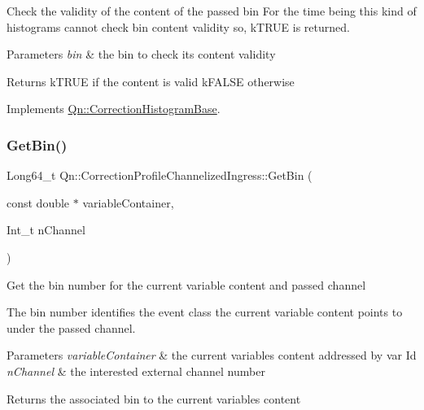Check the validity of the content of the passed bin For the time being this kind of histograms cannot check bin content validity so, k\+T\+R\+UE is returned. 
\begin{DoxyParams}{Parameters}
{\em bin} & the bin to check its content validity \\
\hline
\end{DoxyParams}
\begin{DoxyReturn}{Returns}
k\+T\+R\+UE if the content is valid k\+F\+A\+L\+SE otherwise 
\end{DoxyReturn}


Implements \mbox{\hyperlink{classQn_1_1CorrectionHistogramBase_a4db2c92ceaffefaa91475a721612d80d}{Qn\+::\+Correction\+Histogram\+Base}}.

\mbox{\label{classQn_1_1CorrectionProfileChannelizedIngress_aa9e937955e58199dedc3a75e5d593aa2}} 
\subsubsection{\texorpdfstring{Get\+Bin()}{GetBin()}}
{\footnotesize\ttfamily Long64\+\_\+t Qn\+::\+Correction\+Profile\+Channelized\+Ingress\+::\+Get\+Bin (\begin{DoxyParamCaption}\item[{const double $\ast$}]{variable\+Container,  }\item[{Int\+\_\+t}]{n\+Channel }\end{DoxyParamCaption})\hspace{0.3cm}{\ttfamily [virtual]}}

Get the bin number for the current variable content and passed channel

The bin number identifies the event class the current variable content points to under the passed channel.


\begin{DoxyParams}{Parameters}
{\em variable\+Container} & the current variables content addressed by var Id \\
\hline
{\em n\+Channel} & the interested external channel number \\
\hline
\end{DoxyParams}
\begin{DoxyReturn}{Returns}
the associated bin to the current variables content 
\end{DoxyReturn}


